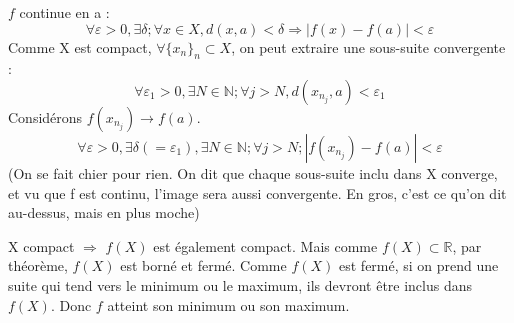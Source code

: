 \begin{dem}
$f$ continue en a : 
\[\forall \varepsilon>0, \exists \delta; \forall x\in X, d(x,a)<\delta \Rightarrow |f(x)-f(a)|<\varepsilon\]
Comme X est compact, $\forall\{x_n\}_n\subset X$, on peut extraire une sous-suite convergente :
\[\forall \varepsilon_1 >0, \exists N\in\mathbb{N}; \forall j>N, d(x_{n_j},a)<\varepsilon_1\]
Considérons $f(x_{n_j})\to f(a)$.
\[\forall \varepsilon>0, \exists \delta(=\varepsilon_1), \exists N\in\mathbb{N}; \forall j>N; |f(x_{n_j})-f(a)|<\varepsilon\]
	(On se fait chier pour rien. On dit que chaque sous-suite inclu dans X converge, et vu que f est continu, l'image sera aussi convergente. En gros, c'est ce qu'on dit au-dessus, mais en plus moche)
\end{dem}


\begin{dem}
	X compact $\Rightarrow$ $f(X)$ est également compact. Mais comme $f(X)\subset\mathbb{R}$, par théorème, $f(X)$ est borné et fermé.
	Comme $f(X)$ est fermé, si on prend une suite qui tend vers le minimum ou le maximum, ils devront être inclus dans $f(X)$. Donc $f$ atteint son minimum ou son maximum.
\end{dem}

